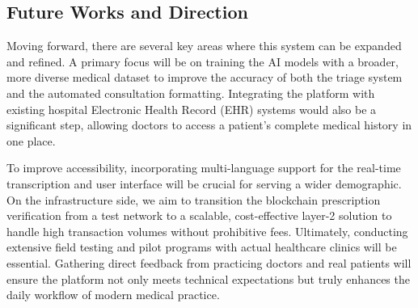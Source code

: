 \subsection{Future Works and Direction}
Moving forward, there are several key areas where this system can be expanded and refined. A primary focus will be on training the AI models with a broader, more diverse medical dataset to improve the accuracy of both the triage system and the automated consultation formatting. Integrating the platform with existing hospital Electronic Health Record (EHR) systems would also be a significant step, allowing doctors to access a patient's complete medical history in one place.

To improve accessibility, incorporating multi-language support for the real-time transcription and user interface will be crucial for serving a wider demographic. On the infrastructure side, we aim to transition the blockchain prescription verification from a test network to a scalable, cost-effective layer-2 solution to handle high transaction volumes without prohibitive fees. Ultimately, conducting extensive field testing and pilot programs with actual healthcare clinics will be essential. Gathering direct feedback from practicing doctors and real patients will ensure the platform not only meets technical expectations but truly enhances the daily workflow of modern medical practice.